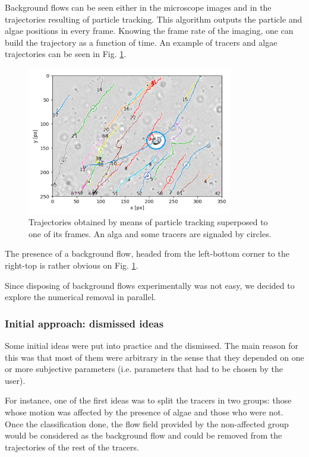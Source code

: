 Background flows can be seen either in the microscope images and in the trajectories resulting of particle tracking. This algorithm outputs the particle and algae positions in every frame. Knowing the frame rate of the imaging, one can build the trajectory as a function of time. An example of tracers and algae trajectories can be seen in Fig. \ref{trajectories_e3}.

\begin{figure}[H]
	\centering
	\includegraphics[width=0.8\textwidth]{archivos/trajectories_e3.png}
	\caption{Trajectories obtained by means of particle tracking superposed to one of its frames. An alga and some tracers are signaled by circles.}
	\label{trajectories_e3}
\end{figure}

The presence of a background flow, headed from the left-bottom corner to the right-top  is rather obvious on Fig. \ref{trajectories_e3}. 

Since disposing of background flows experimentally was not easy, we decided to explore the numerical removal in parallel.

\subsubsection{Initial approach: dismissed ideas}

Some initial ideas were put into practice and the dismissed. The main reason for this was that most of them were arbitrary in the sense that they depended on one or more subjective parameters (i.e. parameters that had to be chosen by the user). 

For instance, one of the first ideas was to split the tracers in two groups: those whose motion was affected by the presence of algae and those who were not. Once the classification done, the flow field provided by the non-affected group would be considered as the background flow and could be removed from the trajectories of the rest of the tracers.

